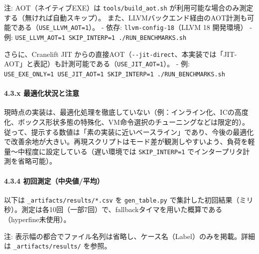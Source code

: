 \documentclass[
]{article}
\begin{document}
注: AOT（ネイティブEXE）は \texttt{tools/build\_aot.sh}
が利用可能な場合のみ測定する（無ければ自動スキップ）。
また、LLVMバックエンド経由のAOT計測も可能である（\texttt{USE\_LLVM\_AOT=1}）。
- 依存: \texttt{llvm-config-18}（LLVM 18 開発環境） - 例:
\texttt{USE\_LLVM\_AOT=1\ SKIP\_INTERP=1\ ./RUN\_BENCHMARKS.sh}

さらに、Cranelift JIT
からの直接AOT（\texttt{-\/-jit-direct}、本実装では「JIT-AOT」と表記）も計測可能である（\texttt{USE\_JIT\_AOT=1}）。
- 例:
\texttt{USE\_EXE\_ONLY=1\ USE\_JIT\_AOT=1\ SKIP\_INTERP=1\ ./RUN\_BENCHMARKS.sh}

\hypertarget{x-ux6700ux9069ux5316ux72b6ux6cc1ux3068ux6ce8ux610f}{%
\paragraph{4.3.x
最適化状況と注意}\label{x-ux6700ux9069ux5316ux72b6ux6cc1ux3068ux6ce8ux610f}}

現時点の実装は、最適化処理を徹底していない（例：インライン化、ICの高度化、ボックス形状多態の特殊化、VM命令選択のチューニングなどは限定的）。従って、提示する数値は「素の実装に近いベースライン」であり、今後の最適化で改善余地が大きい。再現スクリプトはモード差が観測しやすいよう、負荷を軽量〜中程度に設定している（遅い環境では
\texttt{SKIP\_INTERP=1} でインタープリタ計測を省略可能）。

\hypertarget{ux521dux56deux6e2cux5b9aux4e2dux592eux5024ux5e73ux5747}{%
\paragraph{4.3.4
初回測定（中央値/平均）}\label{ux521dux56deux6e2cux5b9aux4e2dux592eux5024ux5e73ux5747}}

以下は \texttt{\_artifacts/results/*.csv} を \texttt{gen\_table.py}
で集計した初回結果（ミリ秒）。測定は各10回（一部7回）で、fallbackタイマを用いた概算である（hyperfine未使用）。

注:
表示幅の都合でファイル名列は省略し、ケース名（Label）のみを掲載。詳細は
\texttt{\_artifacts/results/} を参照。
\end{document}
